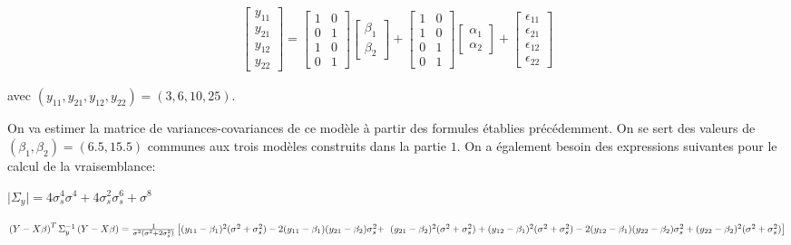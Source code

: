 \begin{equation}
\label{eq:matrix_eqs}
\begin{aligned}
\begin{bmatrix}
y_{11} \\
y_{21} \\
y_{12} \\
y_{22}
\end{bmatrix} = 
\begin{bmatrix}
1 & 0 \\
0 & 1 \\
1 & 0 \\
0 & 1
\end{bmatrix}
\begin{bmatrix}
\beta_1 \\
\beta_2
\end{bmatrix}+
\begin{bmatrix}
1 & 0 \\
1 & 0 \\
0 & 1 \\
0 & 1
\end{bmatrix}
\begin{bmatrix}
\alpha_1 \\
\alpha_2
\end{bmatrix}+
\begin{bmatrix}
\epsilon_{11} \\
\epsilon_{21} \\
\epsilon_{12} \\
\epsilon_{22}
\end{bmatrix}
\end{aligned}
\end{equation}

avec $(y_{11},y_{21}, y_{12}, y_{22})=(3, 6, 10, 25)$.

On va estimer la matrice de variances-covariances de ce modèle à partir des formules établies précédemment. On se sert des valeurs de $(\beta_1,\beta_2)=(6.5, 15.5)$ communes aux trois modèles construits dans la partie $1$. On a également besoin des expressions suivantes pour le calcul de la vraisemblance: 

\vspace{2mm}

$
\lvert\Sigma_y\rvert = 4\sigma_s^4 \sigma^4 + 4\sigma_s^2 \sigma_s^6 + \sigma^8
$

\vspace{2mm}

$
\left(Y-X\beta\right)^T\Sigma_y^{-1}\left(Y-X\beta\right) = \frac{1}{\sigma^2(\sigma^2+2\sigma_s^2)}\left[(y_{11}-\beta_1)^2(\sigma^2+\sigma_s^2) - 2(y_{11}-\beta_1)(y_{21}-\beta_2)\sigma_s^2 + \right. \\ 
\left. (y_{21}-\beta_2)^2(\sigma^2+\sigma_s^2) + (y_{12}-\beta_1)^2(\sigma^2+\sigma_s^2) - 2(y_{12}-\beta_1)(y_{22}-\beta_2)\sigma_s^2 + (y_{22}-\beta_2)^2(\sigma^2+\sigma_s^2) \right]
$

